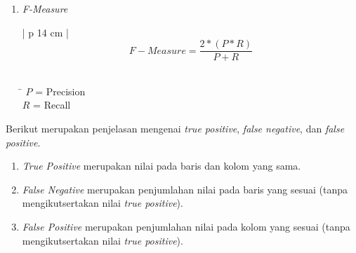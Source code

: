 {\begin{enumerate}[nolistsep,leftmargin=0.5cm]
\begin{tabbing}[H]
\= \kill
\small{\hspace{60mm}$R_i$ = Recall}\\
\small{\hspace{60mm}$TP_i$ = True Positive}\\
\small{\hspace{60mm}$FN_i$ = False Negative}
\end{tabbing}

\item
{\itshape F-Measure}

\begin{table}[H]
\small
\centering
\begin{adjustbox}{width=1\textwidth}
\begin{tabular}{| p {14 cm} |}
\hline
{}
\begin{equation}
F-Measure = \dfrac{2 * (P * R)}{P + R}
\end{equation}\\
\hline
\end{tabular}
\end{adjustbox}
\end{table}

\begin{tabbing}[H]
\= \kill
\small{\hspace{65mm}$P$ = Precision}\\
\small{\hspace{65mm}$R$ = Recall}
\end{tabbing}

\end{enumerate}

\indent
Berikut merupakan penjelasan mengenai {\itshape true positive}, {\itshape false negative}, dan {\itshape false positive}.

\begin{enumerate}[nolistsep,leftmargin=0.5cm]
\item
{\itshape True Positive} merupakan nilai pada baris dan kolom yang sama.
\item
{\itshape False Negative} merupakan penjumlahan nilai pada baris yang sesuai (tanpa mengikutsertakan nilai {\itshape true positive}).
\item
{\itshape False Positive} merupakan penjumlahan nilai pada kolom yang sesuai (tanpa mengikutsertakan nilai {\itshape true positive}).
\end{enumerate}

}
